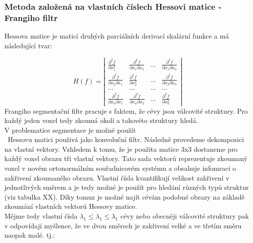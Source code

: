 \documentclass{thesis}%
\begin{document}
\subsubsection{Metoda založená na vlastních číslech Hessovi matice - Frangiho filtr}
Hessova matice je maticí druhých parciálních derivací skalární funkce a má následující tvar:

\begin{equation}
H(f) = \left| \begin{array}{cccc}
\frac{\partial^2 f}{\partial x_{1}^2} & \frac{\partial^2 f}{\partial x_1 \partial x_2} & ... &  \frac{\partial^2 f}{\partial x_1 \partial x_n}\\
\frac{\partial^2 f}{\partial x_2\partial x_1} & \frac{\partial^2 f}{\partial x_2^2} & ... &  \frac{\partial^2 f}{\partial x_2 \partial x_n}\\
... & ... & ... & ...\\
\frac{\partial^2 f}{\partial x_n \partial x_1} & \frac{\partial^2 f}{\partial x_n \partial x_2} & ... &  \frac{\partial^2 f}{\partial x_n^2}
\end{array} \right|
\end{equation}
Frangiho segmentační filtr pracuje s faktem, že cévy jsou válcovité struktury. Pro každý jeden voxel tedy zkoumá okolí a takovéto struktury hledá.\\ V problematice segmentace je možné použít \\\
Hessovu matici použivá jako konvoluční filtr. Následně provedeme dekompozici na vlastní vektory. Vzhledem k tomu, že je použita matice 3x3 dostaneme pro každý voxel obrazu tři vlastní vektory. Tato sada vektorů reprezentuje zkoumaný voxel v novém ortonormálním souřadnicovém systému a obsahuje infomraci o zakřivení zkoumaného obrazu. Vlastní čísla kvantifikují velikost zakřivení v jednotlivých směrem a je tedy možné je použít pro hledání různých typů struktur (viz tabulka XX). Díky tomuz je možné najít cévám podobné obrazy na základě zkoumání vlastních vektorů Hessovy matice.\\
Mějme tedy vlastní čísla $\lambda_1 \leq \lambda_1 \leq \lambda_1$ cévy nebo obecněji válcovité struktury pak v odpovídají myšlence, že ve dvou směrech je zakřivení velké a ve třetím směru naopak malé. tj.:
\end{document}
